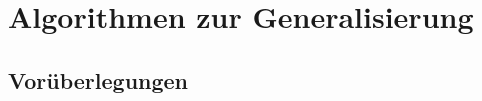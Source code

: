 \documentclass[../main/thesis.tex]{subfiles}
\begin{document}
\chapter{Algorithmen zur Generalisierung}

\section{Vorüberlegungen}



\end{document}

